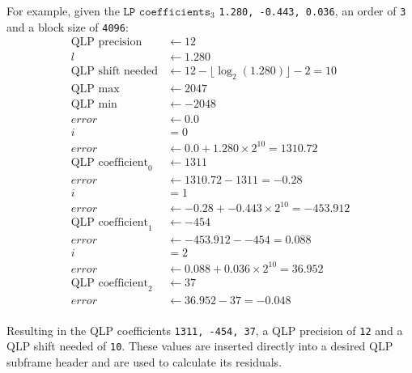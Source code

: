 For example, given the $\texttt{LP coefficients}_3$ \texttt{1.280, -0.443, 0.036},
an order of \texttt{3} and a block size of \texttt{4096}:
\begin{align*}
\text{QLP precision} &\leftarrow 12 \\
l &\leftarrow 1.280 \\
\text{QLP shift needed} &\leftarrow 12 - \lfloor \log_2(1.280) \rfloor - 2 = 10 \\
\text{QLP max} &\leftarrow 2047 \\
\text{QLP min} &\leftarrow -2048 \\
error &\leftarrow 0.0 \\
i &= 0 \\
error &\leftarrow 0.0 + 1.280 \times 2 ^ {10} = 1310.72 \\
\text{QLP coefficient}_0 &\leftarrow 1311 \\
error &\leftarrow 1310.72 - 1311 = -0.28 \\
i &= 1 \\
error &\leftarrow -0.28 + -0.443 \times 2 ^ {10} = -453.912 \\
\text{QLP coefficient}_1 &\leftarrow -454 \\
error &\leftarrow -453.912 - -454 = 0.088 \\
i &= 2 \\
error &\leftarrow 0.088 + 0.036 \times 2 ^ {10} = 36.952 \\
\text{QLP coefficient}_2 &\leftarrow 37 \\
error &\leftarrow 36.952 - 37 = -0.048 \\
\end{align*}
\par
\noindent
Resulting in the QLP coefficients \texttt{1311, -454, 37},
a QLP precision of \texttt{12} and a QLP shift needed of \texttt{10}.
These values are inserted directly into a desired QLP subframe header
and are used to calculate its residuals.

\clearpage

